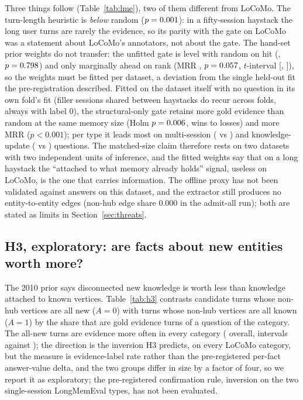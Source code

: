 \documentclass{ceurart}
\newcommand{\Anc}{A}
\begin{document}
Three things follow (Table~\ref{tab:lme}), two of them different from LoCoMo. The turn-length heuristic is \lmeDHitRandomHeat{} \emph{below} random ($p=0.001$): in a fifty-session haystack the long user turns are rarely the evidence, so its parity with the gate on LoCoMo was a statement about LoCoMo's annotators, not about the gate. The hand-set prior weights do not transfer: the unfitted gate is level with random on hit (\lmeDHitPriorRandom, $p=0.798$) and only marginally ahead on rank (MRR \lmeDMrrPriorRandom, $p=0.057$, $t$-interval [\lmeCiLoMrrPriorRandom, \lmeCiHiMrrPriorRandom]), so the weights must be fitted per dataset, a deviation from the single held-out fit the pre-registration described. Fitted on the dataset itself with no question in its own fold's fit (filler sessions shared between haystacks do recur across folds, always with label 0), the structural-only gate retains \lmeDHitFitRandom{} more gold evidence than random at the same memory size (Holm $p=0.006$, \lmeWinsHitFitRandom{} wins to \lmeLossesHitFitRandom{} losses) and \lmeDMrrFitRandom{} more MRR ($p<0.001$); per type it leads most on multi-session (\lmeHitFitMultiSession{} vs \lmeHitRandomMultiSession) and knowledge-update (\lmeHitFitKnowledgeUpdate{} vs \lmeHitRandomKnowledgeUpdate) questions. The matched-size claim therefore rests on two datasets with two independent units of inference, and the fitted weights say that on a long haystack the ``attached to what memory already holds'' signal, useless on LoCoMo, is the one that carries information. The offline proxy has not been validated against answers on this dataset, and the extractor still produces no entity-to-entity edges (non-hub edge share 0.000 in the admit-all run); both are stated as limits in Section~\ref{sec:threats}.

\subsection{H3, exploratory: are facts about new entities worth more?}
\label{sec:h3}
The 2010 prior says disconnected new knowledge is worth less than knowledge attached to known vertices. Table~\ref{tab:h3} contrasts candidate turns whose non-hub vertices are all new ($\Anc=0$) with turns whose non-hub vertices are all known ($\Anc=1$) by the share that are gold evidence turns of a question of the category. The all-new turns are evidence more often in every category (\hThreeDiffAll{} overall, intervals \hThreeNewCiAll{} against \hThreeKnownCiAll); the direction is the inversion H3 predicts, on every LoCoMo category, but the measure is evidence-label rate rather than the pre-registered per-fact answer-value delta, and the two groups differ in size by a factor of four, so we report it as exploratory; the pre-registered confirmation rule, inversion on the two single-session LongMemEval types, has not been evaluated.
\end{document}
